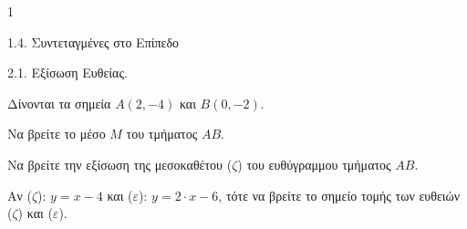 \begin{ylh}{1}
    \item 1.4. Συντεταγμένες στο Επίπεδο
    \item 2.1. Εξίσωση Ευθείας.
\end{ylh}
Δίνονται τα σημεία $A(2, -4)$ και $B(0, -2)$.
\begin{alist}
\item Να βρείτε το μέσο $M$ του τμήματος $AB$. 
\item Να βρείτε την εξίσωση της μεσοκαθέτου ($\zeta$) του ευθύγραμμου τμήματος $AB$. 
\item Αν ($\zeta$): $y = x - 4$ και ($\varepsilon$): $y = 2 \cdot x - 6$, τότε να βρείτε το σημείο τομής των ευθειών ($\zeta$) και ($\varepsilon$). 
\end{alist}
